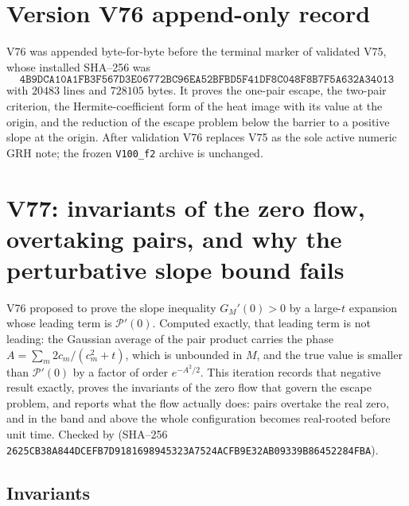 \documentclass[11pt]{article}
\theoremstyle{definition}
\theoremstyle{remark}
\begin{document}
\section*{Version V76 append-only record}

V76 was appended byte-for-byte before the terminal marker of validated
V75, whose installed SHA--256 was
\[
 \texttt{4B9DCA10A1FB3F567D3E06772BC96EA5}
 \allowbreak\texttt{2BFBD5F41DF8C048F8B7F5A632A34013}
\]
with \(20483\) lines and \(728105\) bytes.  It proves the one-pair
escape, the two-pair criterion, the Hermite-coefficient form of the
heat image with its value at the origin, and the reduction of the escape
problem below the barrier to a positive slope at the origin.  After
validation V76 replaces V75 as the sole active numeric GRH note; the
frozen \texttt{V100\_f2} archive is unchanged.





\clearpage
\section{V77: invariants of the zero flow, overtaking pairs, and why the perturbative slope bound fails}
\label{sec:f2v77-flow}
\begingroup
\setcounter{equation}{0}
\renewcommand{\theequation}{N77.\arabic{equation}}
\renewcommand{\theHequation}{f2v77.\arabic{equation}}

V76 proposed to prove the slope inequality \(G_M'(0)>0\) by a large-\(t\)
expansion whose leading term is \(\mathcal P'(0)\).  Computed exactly,
that leading term is not leading: the Gaussian average of the pair
product carries the phase \(A=\sum_m2c_m/(c_m^2+t)\), which is
unbounded in \(M\), and the true value is smaller than \(\mathcal P'(0)\)
by a factor of order \(e^{-A^2/2}\).  This iteration records that
negative result exactly, proves the invariants of the zero flow that
govern the escape problem, and reports what the flow actually does:
pairs overtake the real zero, and in the band and above the whole
configuration becomes real-rooted before unit time.  Checked by
 (SHA--256
\texttt{2625CB38A844DCEFB7D9181698945323}\allowbreak\texttt{A7524ACFB9E32AB09339B86452284FBA}).

\subsection{Invariants}
\end{document}
